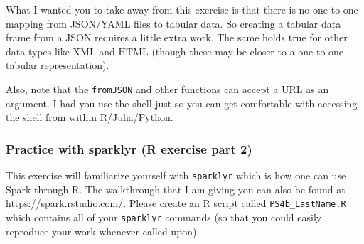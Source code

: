 \documentclass[12pt,english]{exam}
\begin{document}
\begin{questions}
What I wanted you to take away from this exercise is that there is no one-to-one mapping from JSON/YAML files to tabular data. So creating a tabular data frame from a JSON requires a little extra work. The same holds true for other data types like XML and HTML (though these may be closer to a one-to-one tabular representation).

Also, note that the \texttt{fromJSON} and other functions can accept a URL as an argument. I had you use the shell just so you can get comfortable with accessing the shell from within R/Julia/Python.

\subsubsection*{Practice with sparklyr (R exercise part 2)}

\question This exercise will familiarize yourself with \texttt{sparklyr} which is how one can use Spark through R. The walkthrough that I am giving you can also be found at \url{https://spark.rstudio.com/}. Please create an R script called \texttt{PS4b\_LastName.R} which contains all of your \texttt{sparklyr} commands (so that you could easily reproduce your work whenever called upon).


\end{questions}
\end{document}
